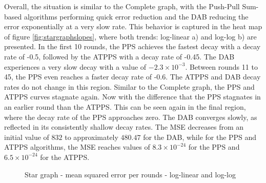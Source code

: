 Overall, the situation is similar to the Complete graph, with the Push-Pull Sum-based algorithms performing quick error reduction and the DAB reducing the error exponentially at a very slow rate. This behavior is captured in the heat map of figure \ref{fig:stargraphslopes}, where both trends: log-linear a) and log-log b) are presented. In the first 10 rounds, the PPS achieves the fastest decay with a decay rate of -0.5, followed by the ATPPS with a decay rate of -0.45. The DAB experiences a very slow decay with a value of $-2.3 \times 10^{-3}$. Between rounds 11 to 45, the PPS even reaches a faster decay rate of -0.6. The ATPPS and DAB decay rates do not change in this region. Similar to the Complete graph, the PPS and ATPPS curves stagnate again. Now with the difference that the PPS stagnates in an earlier round than the ATPPS. This can be seen again in the final region, where the decay rate of the PPS approaches zero. The DAB converges slowly, as reflected in its consistently shallow decay rates. The MSE decreases from an initial value of $832$ to approximately $480.47$ for the DAB, while for the PPS and ATPPS algorithms, the MSE reaches values of $8.3\times 10^{-24}$ for the PPS and $6.5 \times 10^{-24}$ for the ATPPS.
\begin{figure}[!ht]
    \centering
    \hfil
    \caption{Star graph - mean squared error per rounds - log-linear and log-log}
        \label{fig:stargraphMSEperRoundLogLog}
\end{figure}

